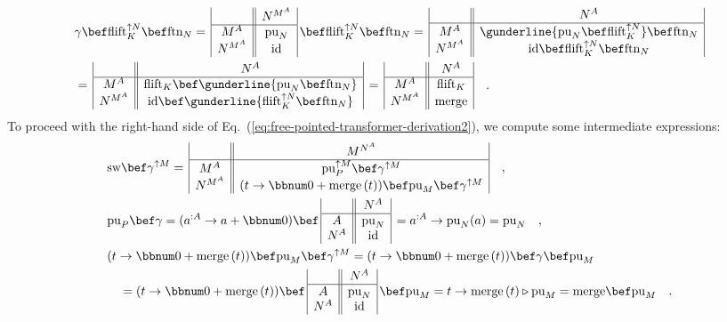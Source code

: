 \begin{align*}
 & \gamma\bef\text{flift}_{K}^{\uparrow N}\bef\text{ftn}_{N}=\,\begin{array}{|c||c|}
 & N^{M^{A}}\\
\hline M^{A} & \text{pu}_{N}\\
N^{M^{A}} & \text{id}
\end{array}\,\bef\text{flift}_{K}^{\uparrow N}\bef\text{ftn}_{N}=\,\begin{array}{|c||c|}
 & N^{A}\\
\hline M^{A} & \gunderline{\text{pu}_{N}\bef\text{flift}_{K}^{\uparrow N}}\bef\text{ftn}_{N}\\
N^{M^{A}} & \text{id}\bef\text{flift}_{K}^{\uparrow N}\bef\text{ftn}_{N}
\end{array}\\
 & =\,\begin{array}{|c||c|}
 & N^{A}\\
\hline M^{A} & \text{flift}_{K}\bef\gunderline{\text{pu}_{N}\bef\text{ftn}_{N}}\\
N^{M^{A}} & \text{id}\bef\gunderline{\text{flift}_{K}^{\uparrow N}\bef\text{ftn}_{N}}
\end{array}\,=\,\begin{array}{|c||c|}
 & N^{A}\\
\hline M^{A} & \text{flift}_{K}\\
N^{M^{A}} & \text{merge}
\end{array}\quad.
\end{align*}
To proceed with the right-hand side of Eq.~(\ref{eq:free-pointed-transformer-derivation2}),
we compute some intermediate expressions:
\begin{align*}
 & \text{sw}\bef\gamma^{\uparrow M}=\,\begin{array}{|c||c|}
 & M^{N^{A}}\\
\hline M^{A} & \text{pu}_{P}^{\uparrow M}\bef\gamma^{\uparrow M}\\
N^{M^{A}} & (t\rightarrow\bbnum 0+\text{merge}\,(t))\bef\text{pu}_{M}\bef\gamma^{\uparrow M}
\end{array}\quad,\\
 & \text{pu}_{P}\bef\gamma=(a^{:A}\rightarrow a+\bbnum 0)\bef\,\begin{array}{|c||c|}
 & N^{A}\\
\hline A & \text{pu}_{N}\\
N^{A} & \text{id}
\end{array}\,=a^{:A}\rightarrow\text{pu}_{N}(a)=\text{pu}_{N}\quad,\\
 & (t\rightarrow\bbnum 0+\text{merge}\,(t))\bef\text{pu}_{M}\bef\gamma^{\uparrow M}=(t\rightarrow\bbnum 0+\text{merge}\,(t))\bef\gamma\bef\text{pu}_{M}\\
 & \quad=(t\rightarrow\bbnum 0+\text{merge}\,(t))\bef\,\begin{array}{|c||c|}
 & N^{A}\\
\hline A & \text{pu}_{N}\\
N^{A} & \text{id}
\end{array}\,\bef\text{pu}_{M}=t\rightarrow\text{merge}\,(t)\triangleright\text{pu}_{M}=\text{merge}\bef\text{pu}_{M}\quad.
\end{align*}
